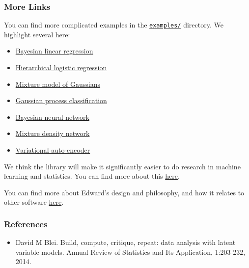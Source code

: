 \subsubsection{More Links}\label{more-links}

You can find more complicated examples in the
\href{https://github.com/blei-lab/edward/tree/master/examples}{\texttt{examples/}}
directory. We highlight several here:

\begin{itemize}
\tightlist
\item
  \href{https://github.com/blei-lab/edward/blob/master/examples/bayesian_linear_regression.py}{Bayesian
  linear regression}
\item
  \href{https://github.com/blei-lab/edward/blob/master/examples/hierarchical_logistic_regression.py}{Hierarchical
  logistic regression}
\item
  \href{https://github.com/blei-lab/edward/blob/master/examples/mixture_gaussian.py}{Mixture
  model of Gaussians}
\item
  \href{https://github.com/blei-lab/edward/blob/master/examples/gp_classification.py}{Gaussian
  process classification}
\item
  \href{https://github.com/blei-lab/edward/blob/master/examples/bayesian_nn.py}{Bayesian
  neural network}
\item
  \href{https://github.com/blei-lab/edward/blob/master/examples/mixture_density_network.py}{Mixture
  density network}
\item
  \href{https://github.com/blei-lab/edward/blob/master/examples/convolutional_vae.py}{Variational
  auto-encoder}
\end{itemize}

We think the library will make it significantly easier to do research in
machine learning and statistics. You can find more about this
\href{guide-research.md}{here}.

You can find more about Edward's design and philosophy, and how it
relates to other software \href{design.md}{here}.

\subsubsection{References}\label{references}

\begin{itemize}
\tightlist
\item
  David M Blei. Build, compute, critique, repeat: data analysis with
  latent variable models. Annual Review of Statistics and Its
  Application, 1:203-232, 2014.
\end{itemize}
